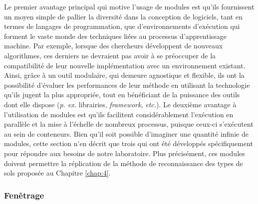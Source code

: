 Le premier avantage principal qui motive l'usage de modules est qu'ils fournissent un moyen simple de pallier la diversité dans la conception de logiciels, tant en termes de langages de programmation, que d'environnements d'exécution qui forment le vaste monde des techniques liées au processus d'apprentissage machine. Par exemple, lorsque des chercheurs développent de nouveaux algorithmes, ces derniers ne devraient pas avoir à se préoccuper de la compatibilité de leur nouvelle implémentation avec un environnement existant. Ainsi, grâce à un outil modulaire, qui demeure agnostique et flexible, ils ont la possibilité d'évaluer les performances de leur méthode en utilisant la technologie qu'ils jugent la plus appropriée, tout en bénéficiant de la puissance des outils dont elle dispose (\textit{p. ex.} librairies, \textit{framework}, \textit{etc.}). Le deuxième avantage à l'utilisation de modules est qu'ils facilitent considérablement l'exécution en parallèle et la mise à l'échelle de nombreux processus, puisque ceux-ci s'exécutent au sein de conteneurs. Bien qu'il soit possible d'imaginer une quantité infinie de modules, cette section n'en décrit que trois qui ont été développés spécifiquement pour répondre aux besoins de notre laboratoire. Plus précisément, ces modules doivent permettre la réplication de la méthode de reconnaissance des types de sols proposée au Chapitre \ref{chap:4}.

\subsubsection{Fenêtrage}

